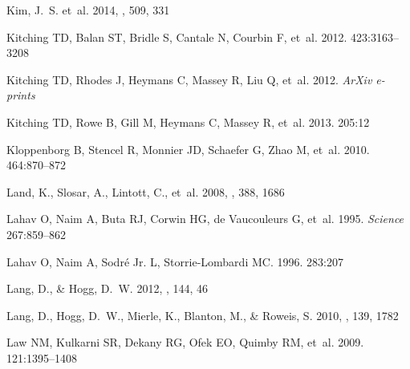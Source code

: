 \documentclass{ar2e}
\begin{document}
\begin{thebibliography}{}
{Kim}, J.~S. et~al. 2014, \nat, 509, 331

{Kitching} TD, {Balan} ST, {Bridle} S, {Cantale} N, {Courbin} F, et~al.
  2012{}.
\newblock \textit{\mnras} 423:3163--3208

{Kitching} TD, {Rhodes} J, {Heymans} C, {Massey} R, {Liu} Q, et~al.
  2012{}.
\newblock \textit{ArXiv e-prints}

{Kitching} TD, {Rowe} B, {Gill} M, {Heymans} C, {Massey} R, et~al. 2013.
\newblock \textit{\apjs} 205:12

{Kloppenborg} B, {Stencel} R, {Monnier} JD, {Schaefer} G, {Zhao} M, et~al.
  2010.
\newblock \textit{\nat} 464:870--872

{Land}, K., {Slosar}, A., {Lintott}, C., {et~al.} 2008, \mnras, 388, 1686

{Lahav} O, {Naim} A, {Buta} RJ, {Corwin} HG, {de Vaucouleurs} G, et~al. 1995.
\newblock \textit{Science} 267:859--862

{Lahav} O, {Naim} A, {Sodr{\'e}} Jr. L, {Storrie-Lombardi} MC. 1996.
\newblock \textit{\mnras} 283:207

{Lang}, D., \& {Hogg}, D.~W. 2012, \aj, 144, 46

{Lang}, D., {Hogg}, D.~W., {Mierle}, K., {Blanton}, M., \& {Roweis}, S. 2010,
  \aj, 139, 1782

{Law} NM, {Kulkarni} SR, {Dekany} RG, {Ofek} EO, {Quimby} RM, et~al. 2009.
\newblock \textit{\pasp} 121:1395--1408


\end{thebibliography}
\end{document}
